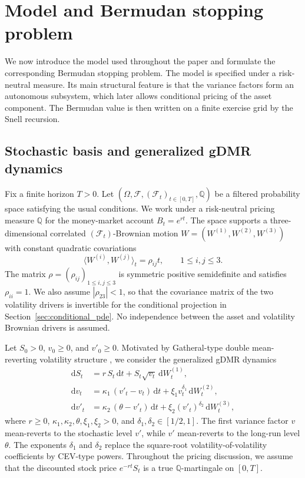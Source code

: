 \documentclass[10pt]{article}
\theoremstyle{plain}
\theoremstyle{definition}
\theoremstyle{remark}
\newcommand{\dd}{\mathrm d}
\newcommand{\Q}{\mathbb Q}
\newcommand{\F}{\mathcal F}
\begin{document}
\section{Model and Bermudan stopping problem}\label{sec:model}

We now introduce the model used throughout the paper and formulate the corresponding Bermudan stopping problem. The model is specified under a risk-neutral measure. Its main structural feature is that the variance factors form an autonomous subsystem, which later allows conditional pricing of the asset component. The Bermudan value is then written on a finite exercise grid by the Snell recursion.

\subsection{Stochastic basis and generalized gDMR dynamics}

Fix a finite horizon $T>0$. Let $(\Omega,\F,(\F_t)_{t\in[0,T]},\Q)$ be a filtered probability space satisfying the usual conditions. We work under a risk-neutral pricing measure $\Q$ for the money-market account $B_t=e^{rt}$. The space supports a three-dimensional correlated $(\F_t)$-Brownian motion $W=(W^{(1)},W^{(2)},W^{(3)})$ with constant quadratic covariations
\[
\langle W^{(i)},W^{(j)}\rangle_t=\rho_{ij}t,\qquad 1\le i,j\le 3.
\]
The matrix $\rho=(\rho_{ij})_{1\le i,j\le 3}$ is symmetric positive semidefinite and satisfies $\rho_{ii}=1$. We also assume $|\rho_{23}|<1$, so that the covariance matrix of the two volatility drivers is invertible for the conditional projection in Section~\ref{sec:conditional_pde}. No independence between the asset and volatility Brownian drivers is assumed.

Let $S_0>0$, $v_0\ge0$, and $v'_0\ge0$. Motivated by Gatheral-type double mean-reverting volatility structure \citep{gatheral2006volsurface,bayer2013fast}, we consider the generalized gDMR dynamics
\begin{equation}\label{eq:gdmr}
\begin{aligned}
\dd S_t &= r\,S_t\,\dd t + S_t\sqrt{v_t}\,\dd W^{(1)}_t,\\
\dd v_t &= \kappa_1\,(v'_t - v_t)\,\dd t + \xi_1 v_t^{\delta_1}\,\dd W^{(2)}_t,\\
\dd v'_t &= \kappa_2\,(\theta - v'_t)\,\dd t + \xi_2 (v'_t)^{\delta_2}\,\dd W^{(3)}_t,
\end{aligned}
\end{equation}
where $r\ge0$, $\kappa_1,\kappa_2,\theta,\xi_1,\xi_2>0$, and $\delta_1,\delta_2\in[1/2,1]$. The first variance factor $v$ mean-reverts to the stochastic level $v'$, while $v'$ mean-reverts to the long-run level $\theta$. The exponents $\delta_1$ and $\delta_2$ replace the square-root volatility-of-volatility coefficients by CEV-type powers. Throughout the pricing discussion, we assume that the discounted stock price $e^{-rt}S_t$ is a true $\Q$-martingale on $[0,T]$.
\end{document}
